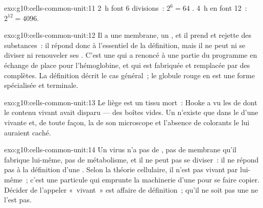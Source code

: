 \begin{solution}{exo:g10:cells-common-unit:11}
\qty{2}{h} font 6 divisions~: $2^6 = 64$ . \qty{4}{h} en font
12~: $2^{12} = 4096$.
\end{solution}

\begin{solution}{exo:g10:cells-common-unit:12}
Il a une membrane, un , et il prend et rejette des
substances~: il répond donc à l'essentiel de la définition, mais il ne
peut ni se diviser ni renouveler ses . C'est une  qui
a renoncé à une partie du programme en échange de place pour
l'hémoglobine, et qui est fabriquée et remplacée par des 
complètes. La définition décrit le cas général~; le globule rouge en
est une forme spécialisée et terminale.
\end{solution}

\begin{solution}{exo:g10:cells-common-unit:13}
Le liège est un tissu mort~: Hooke a vu les  de
 dont le contenu vivant avait disparu --- des boîtes vides. Un
 n'existe que dans le  d'une  vivante et, de
toute façon, la  de son microscope et l'absence de colorants
le lui auraient caché.
\end{solution}

\begin{solution}{exo:g10:cells-common-unit:14}
Un virus n'a pas de , pas de membrane qu'il fabrique
lui-même, pas de métabolisme, et il ne peut pas se diviser~: il ne
répond pas à la définition d'une . Selon la théorie cellulaire,
il n'est pas vivant par lui-même~; c'est une particule qui emprunte la
machinerie d'une  pour se faire copier. Décider de l'appeler
«~vivant~» est affaire de définition~; qu'il ne soit pas une 
ne l'est pas.
\end{solution}

